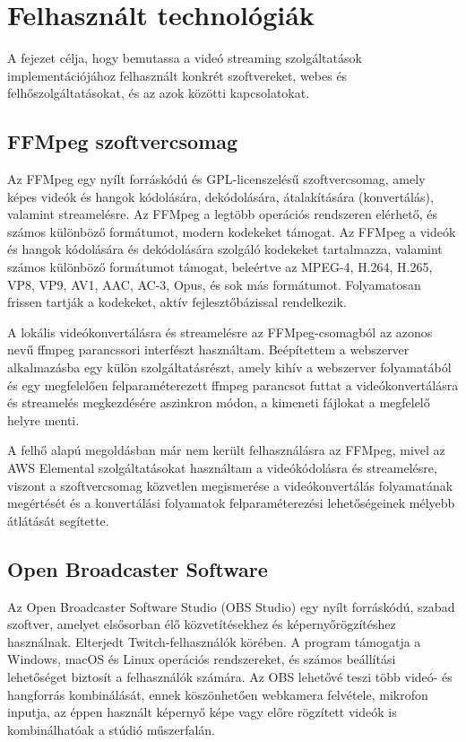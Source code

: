 \chapter{Felhasznált technológiák}

A fejezet célja, hogy bemutassa a videó streaming szolgáltatások implementációjához felhasznált konkrét szoftvereket, webes és felhőszolgáltatásokat, és az azok közötti kapcsolatokat.

\section{FFMpeg szoftvercsomag}

Az FFMpeg egy nyílt forráskódú és GPL-licenszelésű szoftvercsomag, amely képes videók és hangok kódolására, dekódolására, átalakítására (konvertálás), valamint streamelésre. Az FFMpeg a legtöbb operációs rendszeren elérhető, és számos különböző formátumot, modern kodekeket támogat. Az FFMpeg a videók és hangok kódolására és dekódolására szolgáló kodekeket tartalmazza, valamint számos különböző formátumot támogat, beleértve az MPEG-4, H.264, H.265, VP8, VP9, AV1, AAC, AC-3, Opus, és sok más formátumot. Folyamatosan frissen tartják a kodekeket, aktív fejlesztőbázissal rendelkezik.

A lokális videókonvertálásra és streamelésre az FFMpeg-csomagból az azonos nevű ffmpeg parancssori interfészt használtam. Beépítettem a webszerver alkalmazásba egy külön szolgáltatásrészt, amely kihív a webszerver folyamatából és egy megfelelően felparaméterezett ffmpeg parancsot futtat a videókonvertálásra és streamelés megkezdésére aszinkron módon, a kimeneti fájlokat a megfelelő helyre menti.

A felhő alapú megoldásban már nem került felhasználásra az FFMpeg, mivel az AWS Elemental szolgáltatásokat használtam a videókódolásra és streamelésre, viszont a szoftvercsomag közvetlen megismerése a videókonvertálás folyamatának megértését és a konvertálási folyamatok felparaméterezési lehetőségeinek mélyebb átlátását segítette.

\section{Open Broadcaster Software}

Az Open Broadcaster Software Studio (OBS Studio) egy nyílt forráskódú, szabad szoftver, amelyet elsősorban élő közvetítésekhez és képernyőrögzítéshez használnak. Elterjedt Twitch-felhasználók körében. A program támogatja a Windows, macOS és Linux operációs rendszereket, és számos beállítási lehetőséget biztosít a felhasználók számára. Az OBS lehetővé teszi több videó- és hangforrás kombinálását, ennek köszönhetően webkamera felvétele, mikrofon inputja, az éppen használt képernyő képe vagy előre rögzített videók is kombinálhatóak a stúdió műszerfalán.


